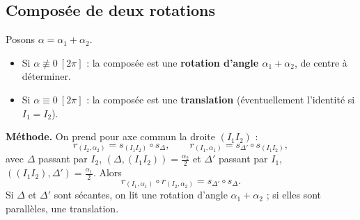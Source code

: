 \begin{center}
\end{center}

\subsection{Composée de deux rotations}

\begin{theoreme}
	Posons $\alpha=\alpha_1+\alpha_2$.
	\begin{itemize}[label=\textbullet]
		\item Si $\alpha\not\equiv 0\ [2\pi]$ : la composée est une
		\textbf{rotation d'angle $\alpha_1+\alpha_2$}, de centre à déterminer.
		\item Si $\alpha\equiv 0\ [2\pi]$ : la composée est une
		\textbf{translation} (éventuellement l'identité si $I_1=I_2$).
	\end{itemize}
\end{theoreme}

\textbf{Méthode.} On prend pour axe commun la droite $(I_1I_2)$ :
$$
r_{(I_2,\alpha_2)} = s_{(I_1I_2)}\circ s_{\Delta},\qquad
r_{(I_1,\alpha_1)} = s_{\Delta'}\circ s_{(I_1I_2)},
$$
avec $\Delta$ passant par $I_2$, $(\Delta,(I_1I_2))=\tfrac{\alpha_2}{2}$ et
$\Delta'$ passant par $I_1$, $((I_1I_2),\Delta')=\tfrac{\alpha_1}{2}$. Alors
$$
r_{(I_1,\alpha_1)}\circ r_{(I_2,\alpha_2)} = s_{\Delta'}\circ s_{\Delta}.
$$
Si $\Delta$ et $\Delta'$ sont sécantes, on lit une rotation d'angle
$\alpha_1+\alpha_2$ ; si elles sont parallèles, une translation.

